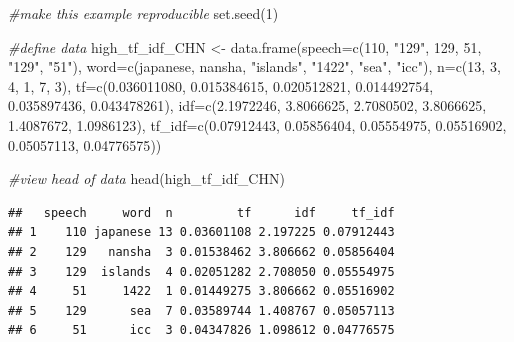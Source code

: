 \documentclass[
]{article}
\newenvironment{Shaded}{\begin{snugshade}}{\end{snugshade}}
\newcommand{\AttributeTok}[1]{\textcolor[rgb]{0.77,0.63,0.00}{#1}}
\newcommand{\CommentTok}[1]{\textcolor[rgb]{0.56,0.35,0.01}{\textit{#1}}}
\newcommand{\DecValTok}[1]{\textcolor[rgb]{0.00,0.00,0.81}{#1}}
\newcommand{\FloatTok}[1]{\textcolor[rgb]{0.00,0.00,0.81}{#1}}
\newcommand{\FunctionTok}[1]{\textcolor[rgb]{0.00,0.00,0.00}{#1}}
\newcommand{\NormalTok}[1]{#1}
\newcommand{\OtherTok}[1]{\textcolor[rgb]{0.56,0.35,0.01}{#1}}
\newcommand{\StringTok}[1]{\textcolor[rgb]{0.31,0.60,0.02}{#1}}
\begin{document}
\begin{Shaded}
\begin{Highlighting}[]
\CommentTok{\#make this example reproducible}
\FunctionTok{set.seed}\NormalTok{(}\DecValTok{1}\NormalTok{)}

\CommentTok{\#define data}
\NormalTok{high\_tf\_idf\_CHN }\OtherTok{\textless{}{-}} \FunctionTok{data.frame}\NormalTok{(}\AttributeTok{speech=}\FunctionTok{c}\NormalTok{(}\StringTok{\textquotesingle{}110\textquotesingle{}}\NormalTok{, }\StringTok{"129"}\NormalTok{, }\StringTok{\textquotesingle{}129\textquotesingle{}}\NormalTok{, }\StringTok{\textquotesingle{}51\textquotesingle{}}\NormalTok{, }\StringTok{"129"}\NormalTok{, }\StringTok{"51"}\NormalTok{),}
                 \AttributeTok{word=}\FunctionTok{c}\NormalTok{(}\StringTok{\textquotesingle{}japanese\textquotesingle{}}\NormalTok{, }\StringTok{\textquotesingle{}nansha\textquotesingle{}}\NormalTok{, }\StringTok{"islands"}\NormalTok{, }\StringTok{"1422"}\NormalTok{, }\StringTok{"sea"}\NormalTok{, }\StringTok{"icc"}\NormalTok{),}
                 \AttributeTok{n=}\FunctionTok{c}\NormalTok{(}\DecValTok{13}\NormalTok{, }\DecValTok{3}\NormalTok{, }\DecValTok{4}\NormalTok{, }\DecValTok{1}\NormalTok{, }\DecValTok{7}\NormalTok{, }\DecValTok{3}\NormalTok{),}
                \AttributeTok{tf=}\FunctionTok{c}\NormalTok{(}\FloatTok{0.036011080}\NormalTok{, }\FloatTok{0.015384615}\NormalTok{, }\FloatTok{0.020512821}\NormalTok{, }\FloatTok{0.014492754}\NormalTok{, }\FloatTok{0.035897436}\NormalTok{, }\FloatTok{0.043478261}\NormalTok{),}
                \AttributeTok{idf=}\FunctionTok{c}\NormalTok{(}\FloatTok{2.1972246}\NormalTok{, }\FloatTok{3.8066625}\NormalTok{, }\FloatTok{2.7080502}\NormalTok{, }\FloatTok{3.8066625}\NormalTok{, }\FloatTok{1.4087672}\NormalTok{, }\FloatTok{1.0986123}\NormalTok{),}
                \AttributeTok{tf\_idf=}\FunctionTok{c}\NormalTok{(}\FloatTok{0.07912443}\NormalTok{, }\FloatTok{0.05856404}\NormalTok{, }\FloatTok{0.05554975}\NormalTok{, }\FloatTok{0.05516902}\NormalTok{, }\FloatTok{0.05057113}\NormalTok{, }\FloatTok{0.04776575}\NormalTok{))}
                
\CommentTok{\#view head of data }
\FunctionTok{head}\NormalTok{(high\_tf\_idf\_CHN)}
\end{Highlighting}
\end{Shaded}

\begin{verbatim}
##   speech     word  n         tf      idf     tf_idf
## 1    110 japanese 13 0.03601108 2.197225 0.07912443
## 2    129   nansha  3 0.01538462 3.806662 0.05856404
## 3    129  islands  4 0.02051282 2.708050 0.05554975
## 4     51     1422  1 0.01449275 3.806662 0.05516902
## 5    129      sea  7 0.03589744 1.408767 0.05057113
## 6     51      icc  3 0.04347826 1.098612 0.04776575
\end{verbatim}
\end{document}
